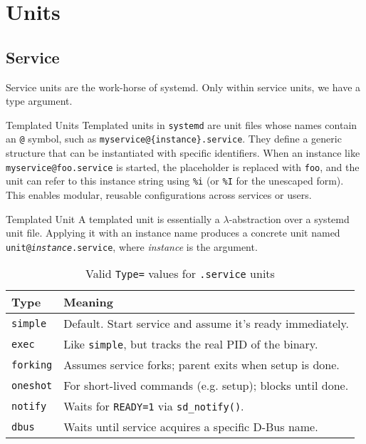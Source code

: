 \documentclass[openany, 12pt]{book}
\begin{document}
\chapter{Units}
\section{Service}
Service units are the work-horse of systemd. Only within service units, we have
a type argument.

\begin{definition}{Templated Units}{}
	Templated units in \texttt{systemd} are unit files whose names contain an
	\texttt{@} symbol, such as \texttt{myservice@\{instance\}.service}. They define
	a generic structure that can be instantiated with specific identifiers. When an
	instance like \texttt{myservice@foo.service} is started, the placeholder is
	replaced with \texttt{foo}, and the unit can refer to this instance string using
	\texttt{\%i} (or \texttt{\%I} for the unescaped form). This enables modular,
	reusable configurations across services or users.
\end{definition}

\begin{intuition}{Templated Unit}{}
	A templated unit is essentially a $\lambda$-abstraction over a systemd unit
	file. Applying it with an instance name produces a concrete unit named
	\texttt{unit@\textit{instance}.service}, where \textit{instance} is the
	argument.
\end{intuition}


\begin{table}[h]
	\centering
	\begin{tabular}{@{}ll@{}}
		\toprule
		\textbf{Type}    & \textbf{Meaning}                                             \\ \midrule
		\texttt{simple}  & Default. Start service and assume it's ready immediately.    \\
		\texttt{exec}    & Like \texttt{simple}, but tracks the real PID of the binary. \\
		\texttt{forking} & Assumes service forks; parent exits when setup is done.      \\
		\texttt{oneshot} & For short-lived commands (e.g. setup); blocks until done.    \\
		\texttt{notify}  & Waits for \texttt{READY=1} via \texttt{sd\_notify()}.        \\
		\texttt{dbus}    & Waits until service acquires a specific D-Bus name.          \\
		\bottomrule
	\end{tabular}
	\caption{Valid \texttt{Type=} values for \texttt{.service} units}
\end{table}
\end{document}
